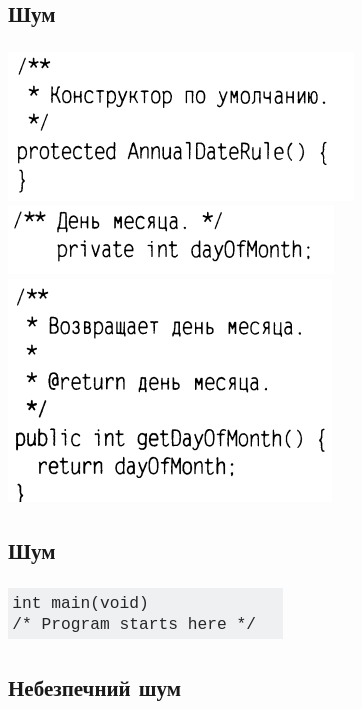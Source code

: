 \documentclass[12pt,pdf,utf8,ukrainian,aspectratio=169]{beamer}
\makeatletter
\newcommand*{\currentname}{\@currentlabelname}
\makeatother
\begin{document}
	\subsection{Шум}
	\begin{frame}[label={slideError}]\frametitle{\currentname}
		\includegraphics[scale=0.5]{clean_code_13_1.png} \\
		\includegraphics[scale=0.5]{clean_code_13_2.png} \\
		\includegraphics[scale=0.5]{clean_code_13_3.png} \\
	\end{frame}	

	\subsection{Шум}
	\begin{frame}[label={slideError}]\frametitle{\currentname}
		\includegraphics[scale=0.7]{Comment_05.png}
	\end{frame}	

	\subsection{Небезпечний шум}
\end{document}
